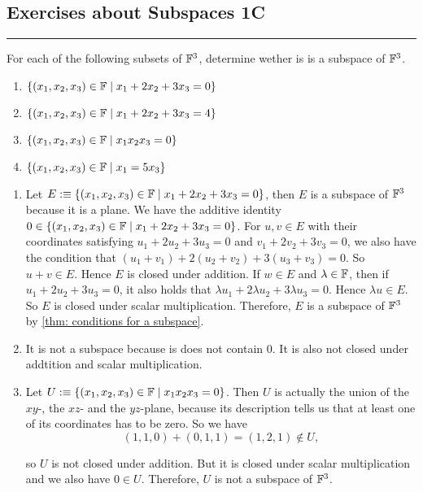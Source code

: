 \subsection*{Exercises about Subspaces 1C}
\hrule
\phantom{.}

\begin{xrcs}
  For each of the following subsets of $\mathbb{F}^3$, determine wether is is a subspace of $\mathbb{F}^3$.
  \begin{enumerate}
    \item $\{(x_1, x_2, x_3) \in \mathbb{F} \mid x_1 + 2x_2 + 3 x_3 = 0\}$
    \item $\{(x_1, x_2, x_3) \in \mathbb{F} \mid x_1 + 2x_2 + 3 x_3 = 4\}$
    \item $\{(x_1, x_2, x_3) \in \mathbb{F} \mid x_1 x_2 x_3 = 0\}$
    \item $\{(x_1, x_2, x_3) \in \mathbb{F} \mid x_1 = 5x_3\}$
  \end{enumerate}

  \begin{enumerate}
    \item Let $E :\equiv \{(x_1, x_2, x_3) \in \mathbb{F} \mid x_1 + 2x_2 + 3 x_3 = 0\}$, then $E$ is a subspace of $\mathbb{F}^3$ because it is a plane. We have the additive identity  $0 \in \{(x_1, x_2, x_3) \in \mathbb{F} \mid x_1 + 2x_2 + 3 x_3 = 0\}$. For $u,v \in E$ with their coordinates satisfying $u_1 + 2u_2 + 3u_3 = 0$ and $v_1 + 2v_2 + 3v_3 = 0$, we also have the condition that $(u_1 + v_1) + 2 (u_2 + v_2) + 3(u_3 + v_3)= 0$. So $u+v \in E$. Hence $E$ is closed under addition. If $w \in E$ and $\lambda \in \mathbb{F}$, then if $u_1 + 2u_2 + 3u_3 = 0$, it also holds that $\lambda u_1 + 2\lambda u_2 + 3\lambda u_3 = 0$. Hence $\lambda u \in E$. So $E$ is closed under scalar multiplication. Therefore, $E$ is a subspace of $\mathbb{F}^3$ by \ref{thm: conditions for a subspace}.

    \item It is not a subspace because is does not contain $0$. It is also not closed under addtition and scalar multiplication.

    \item Let $U :\equiv \{(x_1, x_2, x_3) \in \mathbb{F} \mid x_1 x_2 x_3 = 0\}$. Then $U$ is actually the union of the $xy$-, the $xz$- and the $yz$-plane, because its description tells us that at least one of its coordinates has to be zero. So we have
    \[
    (1,1,0) + (0,1,1) = (1,2,1) \notin U,
    \]

    so $U$ is not closed under addition. But it is closed under scalar multiplication and we also have $0 \in U$. Therefore, $U$ is not a subspace of $\mathbb{F}^3$.


\end{enumerate}
\end{xrcs}
